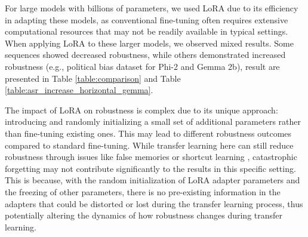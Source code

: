 \documentclass{article}
\begin{document}
For large models with billions of parameters, we used LoRA due to its efficiency in adapting these models, as conventional fine-tuning often requires extensive computational resources that may not be readily available in typical settings. When applying LoRA to these larger models, we observed mixed results. Some sequences showed decreased robustness, while others demonstrated increased robustness (e.g., political bias dataset for Phi-2 and Gemma 2b), result are presented in Table \ref{table:comparison} and Table \ref{table:asr_increase_horizontal_gemma}.



The impact of LoRA on robustness is complex due to its unique approach: introducing and randomly initializing a small set of additional parameters rather than fine-tuning existing ones. This may lead to different robustness outcomes compared to standard fine-tuning. While transfer learning here can still reduce robustness through issues like false memories \cite{gekhman2024does} or shortcut learning \cite{du2023shortcut}, catastrophic forgetting \cite{luo2023empirical} may not contribute significantly to the results in this specific setting. This is because, with the random initialization of LoRA adapter parameters and the freezing of other parameters, there is no pre-existing information in the adapters that could be distorted or lost during the transfer learning process, thus potentially altering the dynamics of how robustness changes during transfer learning.
\end{document}

